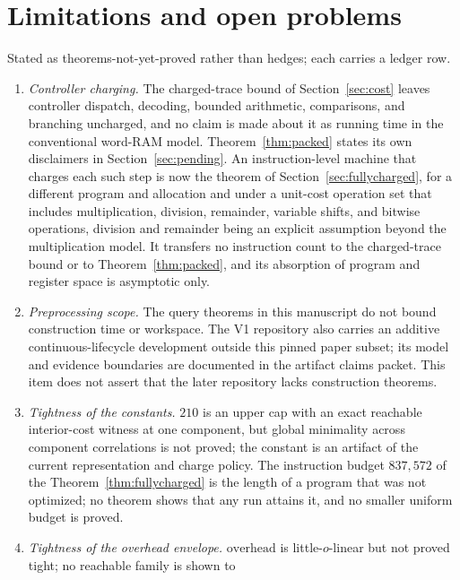 \documentclass[11pt]{article}
\newcommand{\ledger}[1]{}
\theoremstyle{definition}
\theoremstyle{remark}
\begin{document}
\section{Limitations and open problems}\label{sec:limitations}

Stated as theorems-not-yet-proved rather than hedges; each carries a ledger
row.

\begin{enumerate}
\item \emph{Controller charging.} The charged-trace bound of
  Section~\ref{sec:cost} leaves controller dispatch, decoding, bounded
  arithmetic, comparisons, and branching uncharged, and no claim is made
  about it as running time in the conventional word-RAM
  model.\ledger{L-OPEN-06} Theorem~\ref{thm:packed} states its own
  disclaimers in Section~\ref{sec:pending}. An instruction-level machine
  that charges each such step is now the theorem of
  Section~\ref{sec:fullycharged}, for a different program and allocation
  and under a unit-cost operation set that
  includes multiplication, division, remainder, variable shifts, and bitwise
  operations, division and remainder being an explicit assumption beyond the
  multiplication model. It transfers no instruction count to the
  charged-trace bound or to Theorem~\ref{thm:packed}, and its absorption of
  program and register space is asymptotic only.\ledger{L-PQ-01}
\item \emph{Preprocessing scope.} The query theorems in this manuscript
  do not bound construction time or workspace. The V1 repository also carries
  an additive continuous-lifecycle development outside this pinned paper
  subset; its model and evidence boundaries are documented in the artifact
  claims packet. This item does not assert that the later repository lacks
  construction theorems.
  \ledger{L-OPEN-01}
\item \emph{Tightness of the constants.} $210$ is an upper cap with an
  exact reachable interior-cost witness at one component, but global
  minimality across component correlations is not proved; the constant is
  an artifact of the current representation and charge policy.
  \ledger{L-OPEN-02} The instruction budget $837{,}572$ of the Theorem~\ref{thm:fullycharged} is the length of a program that was not
  optimized; no theorem shows that any run attains it, and no smaller
  uniform budget is proved.\ledger{L-OPEN-07}
\item \emph{Tightness of the overhead envelope.} $\mathrm{overhead}$ is
  little-$o$-linear but not proved tight; no reachable family is shown to

\end{enumerate}
\end{document}
